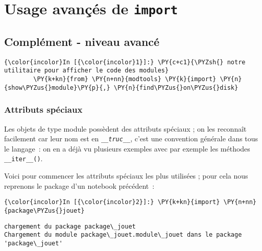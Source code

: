     
    
    
    

    

    \hypertarget{usage-avanuxe7uxe9s-de-import}{%
\section{\texorpdfstring{Usage avançés de
\texttt{import}}{Usage avançés de import}}\label{usage-avanuxe7uxe9s-de-import}}

    \hypertarget{compluxe9ment---niveau-avancuxe9}{%
\subsection{Complément - niveau
avancé}\label{compluxe9ment---niveau-avancuxe9}}

    \begin{Verbatim}[commandchars=\\\{\},frame=single,framerule=0.3mm,rulecolor=\color{cellframecolor}]
{\color{incolor}In [{\color{incolor}1}]:} \PY{c+c1}{\PYZsh{} notre utilitaire pour afficher le code des modules}
        \PY{k+kn}{from} \PY{n+nn}{modtools} \PY{k}{import} \PY{n}{show\PYZus{}module}\PY{p}{,} \PY{n}{find\PYZus{}on\PYZus{}disk}
\end{Verbatim}


    \hypertarget{attributs-spuxe9ciaux}{%
\subsubsection{Attributs spéciaux}\label{attributs-spuxe9ciaux}}

    Les objets de type module possèdent des attributs spéciaux ; on les
reconnaît facilement car leur nom est en \emph{\texttt{\_\_truc\_\_}},
c'est une convention générale dans tous le langage~: on en a déjà vu
plusieurs exemples avec par exemple les méthodes
\texttt{\_\_iter\_\_()}.

    Voici pour commencer les attributs spéciaux les plus utilisées ; pour
cela nous reprenons le package d'un notebook précédent~:

    \begin{Verbatim}[commandchars=\\\{\},frame=single,framerule=0.3mm,rulecolor=\color{cellframecolor}]
{\color{incolor}In [{\color{incolor}2}]:} \PY{k+kn}{import} \PY{n+nn}{package\PYZus{}jouet}
\end{Verbatim}


    \begin{Verbatim}[commandchars=\\\{\},frame=single,framerule=0.3mm,rulecolor=\color{cellframecolor}]
chargement du package package\_jouet
Chargement du module package\_jouet.module\_jouet dans le package 'package\_jouet'
\end{Verbatim}

